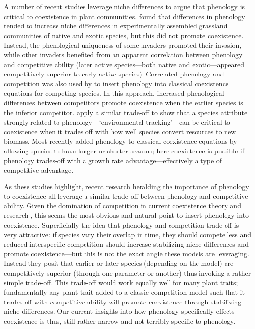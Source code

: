 \documentclass[11pt]{article}
\begin{document}
A number of recent studies leverage niche differences to argue that phenology is critical to coexistence in plant communities. \citet{godoy2014} found that differences in phenology tended to increase niche differences in experimentally assembled grassland communities of native and exotic species, but this did not promote coexistence. Instead, the phenological uniqueness of some invaders promoted their invasion, while other invaders benefited from an apparent correlation between phenology and competitive ability (later active species---both native and exotic---appeared competitively superior to early-active species). Correlated phenology and competition was also used by \citet{rudolf2019role} to insert phenology into classical coexistence equations for competing species. In this approach, increased phenological differences between competitors promote coexistence when the earlier species is the inferior competitor. \citet{memegan2021} apply a similar trade-off to show that a species attribute strongly related to phenology---`environmental tracking'---can be critical to coexistence when it trades off with how well species convert resources to new biomass. Most recently \citet{levine2022competition} added phenology to classical coexistence equations by allowing species to have longer or shorter seasons; here coexistence is possible if phenology trades-off with a growth rate advantage---effectively a type of competitive advantage.  

As these studies highlight, recent research heralding the importance of phenology to coexistence all leverage a similar trade-off between phenology and competitive ability. Given the domination of competition in current coexistence theory and research \citep{mcpeek2022coexistence}, this seems the most obvious and natural point to insert phenology into coexistence. Superficially the idea that phenology and competition trade-off is very attractive: if species vary their overlap in time, they should compete less and reduced interspecific competition should increase stabilizing niche differences and promote coexistence---but this is not the exact angle these models are leveraging. Instead they posit that earlier or later species (depending on the model) are competitively superior (through one parameter or another) thus invoking a rather simple trade-off. This trade-off would work equally well for many plant traits; fundamentally any plant trait added to a classic competition model such that it trades off with competitive ability will promote coexistence through stabilizing niche differences. Our current insights into how phenology specifically effects coexistence is thus, still rather narrow and not terribly specific to phenology. 
\end{document}
